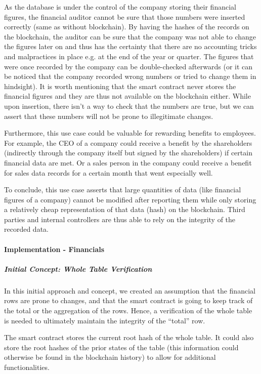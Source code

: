 As the database is under the control of the company storing their financial figures, the financial auditor cannot be sure that those numbers were inserted correctly (same as without blockchain). By having the hashes of the records on the blockchain, the auditor can be sure that the company was not able to change the figures later on and thus has the certainty that there are no accounting tricks and malpractices in place e.g. at the end of the year or quarter. The figures that were once recorded by the company can be double-checked afterwards (or it can be noticed that the company recorded wrong numbers or tried to change them in hindsight). It is worth mentioning that the smart contract never stores the financial figures and they are thus not available on the blockchain either. While upon insertion, there isn’t a way to check that the numbers are true, but we can assert that these numbers will not be prone to illegitimate changes.

Furthermore, this use case could be valuable for rewarding benefits to employees. For example, the CEO of a company could receive a benefit by the shareholders (indirectly through the company itself but signed by the shareholders) if certain financial data are met. Or a sales person in the company could receive a benefit for sales data records for a certain month that went especially well.

To conclude, this use case asserts that large quantities of data (like financial figures of a company) cannot be modified after reporting them while only storing a relatively cheap representation of that data (hash) on the blockchain. Third parties and internal controllers are thus able to rely on the integrity of the recorded data.

\paragraph{Implementation - Financials}
\subparagraph{Initial Concept: Whole Table Verification}

In this initial approach and concept, we created an assumption that the financial rows are prone to changes, and that the smart contract is going to keep track of the total or the aggregation of the rows. Hence, a verification of the whole table is needed to ultimately maintain the integrity of the “total” row.

The smart contract stores the current root hash of the whole table. It could also store the root hashes of the prior states of the table (this information could otherwise be found in the blockchain history) to allow for additional functionalities.

